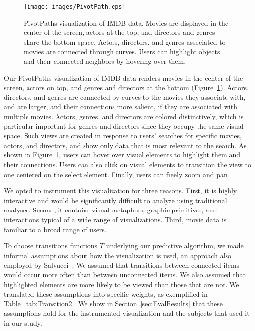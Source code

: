 \begin{figure}[htb]
  \centering
  \texttt{[image: images/PivotPath.eps]}
  \caption{PivotPaths visualization of IMDB data. Movies are displayed in the center of the screen, actors at the top, and directors and genres share the bottom space. Actors, directors, and genres associated to movies are connected through curves. Users can highlight objects and their connected neighbors by hovering over them.}
	\label{fig:pivotpaths}
\end{figure}
Our PivotPaths visualization of IMDB data renders movies in the center of the screen, actors on top, and genres and directors at the bottom (Figure~\ref{fig:pivotpaths}). Actors, directors, and genres are connected by curves to the movies they associate with, and are larger, and their connections more salient, if they are associated with multiple movies. Actors, genres, and directors are colored distinctively, which is particular important for genres and directors since they occupy the same visual space. Such views are created in response to users' searches for specific movies, actors, and directors, and show only data that is most relevant to the search. As shown in Figure~\ref{fig:pivotpaths}, users can hover over visual elements to highlight them and their connections. Users can also click on visual elements to transition the view to one centered on the select element. Finally, users can freely zoom and pan. 

We opted to instrument this visualization for three reasons. First, it is highly interactive and would be significantly difficult to analyze using traditional analyses. Second, it contains visual metaphors, graphic primitives, and interactions typical of a wide range of visualizations. Third, movie data is familiar to a broad range of users.  

To choose transitions functions $T$ underlying our predictive algorithm, we made informal assumptions about how the visualization is used, an approach also employed by Salvucci~\cite{Sal00}. We assumed that transitions between connected items would occur more often than between unconnected items. We also assumed that highlighted elements are more likely to be viewed than those that are not. We translated these assumptions into specific weights, as exemplified in Table~\ref{tab:Transition2}. We show in Section~\ref{sec:EvalResults} that these assumptions hold for the instrumented visualization and the subjects that used it in our study. 

